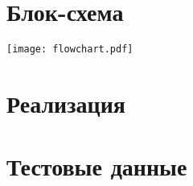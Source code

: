 \documentclass[a4paper,11pt]{article}
\begin{document}
\part*{Блок-схема} 
 \texttt{[image: flowchart.pdf]} 


\newpage
\part*{Реализация}

\newpage

 
\newpage
\part*{Тестовые данные}
\begin{footnotesize}
\framebox
{ 
  \begin{minipage}[t]{0.4\linewidth}   
  
  \end{minipage}
  \begin{minipage}[t]{0.6\linewidth}
  
  \end{minipage}
}
\framebox
{
  \begin{minipage}[t]{0.4\linewidth}
  
  \end{minipage}
  \begin{minipage}[t]{0.6\linewidth}
  
  \end{minipage}  
}
\framebox
{
  \begin{minipage}[t]{0.4\linewidth}
  
  \end{minipage}
  \begin{minipage}[t]{0.6\linewidth}
  
  \end{minipage}
}
\framebox
{
  \begin{minipage}[t]{0.4\linewidth}
  
  \end{minipage}
  \begin{minipage}[t]{0.6\linewidth}
  
  \end{minipage}  
}
\end{footnotesize}
\end{document}
